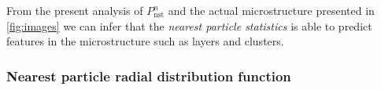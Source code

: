 From the present analysis of $P_\text{nst}^n$ and the actual microstructure presented in \ref{fig:images} we can infer that the \textit{nearest particle statistics} is able to predict features in the microstructure such as layers and clusters. 


\subsubsection*{Nearest particle radial distribution function }

